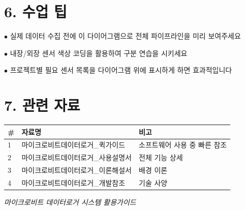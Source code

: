 \documentclass[11pt,a4paper]{article}
\begin{document}
\section*{6. 수업 팁}

$\bullet$  실제 데이터 수집 전에 이 다이어그램으로 전체 파이프라인을 미리 보여주세요

$\bullet$  내장/외장 센서 색상 코딩을 활용하여 구분 연습을 시키세요

$\bullet$  프로젝트별 필요 센서 목록을 다이어그램 위에 표시하게 하면 효과적입니다



\section*{7. 관련 자료}

\begin{center}
\renewcommand{\arraystretch}{1.4}
\begin{tabular}{|p{1.5cm}|p{6.9cm}|p{6.6cm}|}
\hline
\rowcolor{tableheader}
\textbf{\#} & \textbf{자료명} & \textbf{비고} \\
\hline
1 & 마이크로비트데이터로거\_퀵가이드 & 소프트웨어 사용 중 빠른 참조 \\
\hline
2 & 마이크로비트데이터로거\_사용설명서 & 전체 기능 상세 \\
\hline
3 & 마이크로비트데이터로거\_이론해설서 & 배경 이론 \\
\hline
4 & 마이크로비트데이터로거\_개발참조 & 기술 사양 \\
\hline
\end{tabular}
\end{center}


\vfill
\begin{center}
\small\color{lightbrown}
\textit{마이크로비트 데이터로거 시스템 활용가이드}
\end{center}
\end{document}
